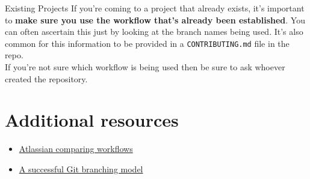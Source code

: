 \begin{infobox}{Existing Projects}
    If you're coming to a project that already exists, it's important to \textbf{make sure you use the workflow that's already been established}. You can often ascertain this just by looking at the branch names being used. It's also common for this information to be provided in a \texttt{CONTRIBUTING.md} file in the repo.
    \\

    If you're not sure which workflow is being used then be sure to ask whoever created the repository.
\end{infobox}



\section{Additional resources}

\begin{itemize}[leftmargin=*]
    \item \href{https://www.atlassian.com/git/tutorials/comparing-workflows}{Atlassian comparing workflows}
	\item \href{https://nvie.com/posts/a-successful-git-branching-model/}{A successful Git branching model}
\end{itemize}

